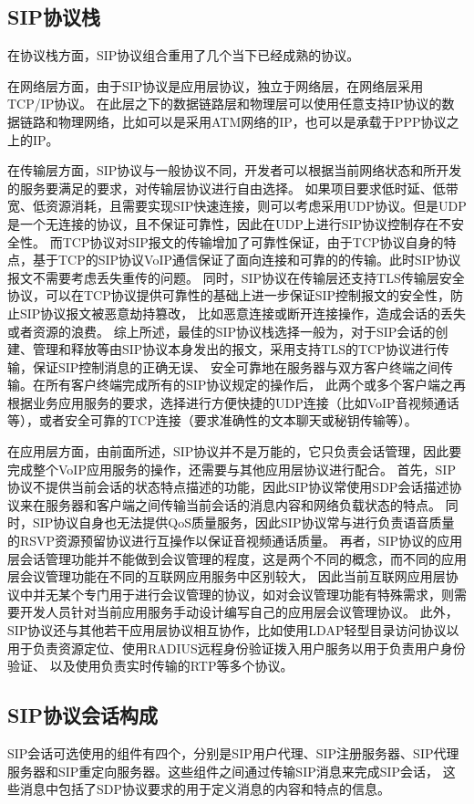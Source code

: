 \documentclass[a4paper,AutoFakeBold,oneside,12pt]{book}
\begin{document}
\subsection{SIP协议栈}
在协议栈方面，SIP协议组合重用了几个当下已经成熟的协议。

在网络层方面，由于SIP协议是应用层协议，独立于网络层，在网络层采用TCP/IP协议。%
在此层之下的数据链路层和物理层可以使用任意支持IP协议的数据链路和物理网络，比如可以是采用ATM网络的IP，也可以是承载于PPP协议之上的IP。

在传输层方面，SIP协议与一般协议不同，开发者可以根据当前网络状态和所开发的服务要满足的要求，对传输层协议进行自由选择。
如果项目要求低时延、低带宽、低资源消耗，且需要实现SIP快速连接，则可以考虑采用UDP协议。但是UDP是一个无连接的协议，且不保证可靠性，因此在UDP上进行SIP协议控制存在不安全性。
而TCP协议对SIP报文的传输增加了可靠性保证，由于TCP协议自身的特点，基于TCP的SIP协议VoIP通信保证了面向连接和可靠的的传输。此时SIP协议报文不需要考虑丢失重传的问题。
同时，SIP协议在传输层还支持TLS传输层安全协议，可以在TCP协议提供可靠性的基础上进一步保证SIP控制报文的安全性，防止SIP协议报文被恶意劫持篡改，
比如恶意连接或断开连接操作，造成会话的丢失或者资源的浪费。
综上所述，最佳的SIP协议栈选择一般为，对于SIP会话的创建、管理和释放等由SIP协议本身发出的报文，采用支持TLS的TCP协议进行传输，保证SIP控制消息的正确无误、
安全可靠地在服务器与双方客户终端之间传输。在所有客户终端完成所有的SIP协议规定的操作后，
此两个或多个客户端之再根据业务应用服务的要求，选择进行方便快捷的UDP连接（比如VoIP音视频通话等），或者安全可靠的TCP连接（要求准确性的文本聊天或秘钥传输等）。

在应用层方面，由前面所述，SIP协议并不是万能的，它只负责会话管理，因此要完成整个VoIP应用服务的操作，还需要与其他应用层协议进行配合。
首先，SIP协议不提供当前会话的状态特点描述的功能，因此SIP协议常使用SDP会话描述协议来在服务器和客户端之间传输当前会话的消息内容和网络负载状态的特点。
同时，SIP协议自身也无法提供QoS质量服务，因此SIP协议常与进行负责语音质量的RSVP资源预留协议进行互操作以保证音视频通话质量。
再者，SIP协议的应用层会话管理功能并不能做到会议管理的程度，这是两个不同的概念，而不同的应用层会议管理功能在不同的互联网应用服务中区别较大，
因此当前互联网应用层协议中并无某个专门用于进行会议管理的协议，如对会议管理功能有特殊需求，则需要开发人员针对当前应用服务手动设计编写自己的应用层会议管理协议。
此外，SIP协议还与其他若干应用层协议相互协作，比如使用LDAP轻型目录访问协议以用于负责资源定位、使用RADIUS远程身份验证拨入用户服务以用于负责用户身份验证、
以及使用负责实时传输的RTP等多个协议。
\subsection{SIP协议会话构成}
SIP会话可选使用的组件有四个，分别是SIP用户代理、SIP注册服务器、SIP代理服务器和SIP重定向服务器。这些组件之间通过传输SIP消息来完成SIP会话，
这些消息中包括了SDP协议要求的用于定义消息的内容和特点的信息。
\end{document}
